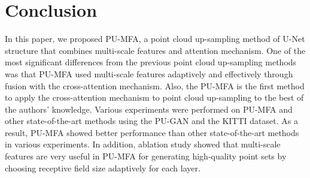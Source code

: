 \documentclass{article}
\begin{document}
\begin{table}[htb!]
\centering
{}
\caption{Quantitative evaluation results of the noise effects using the PU-GAN dataset.}
\label{tab:noise_test}
\end{table}

\section{Conclusion}
\label{sec:conclusion}
\quad In this paper, we proposed PU-MFA, a point cloud up-sampling method of U-Net structure that combines multi-scale features and attention mechanism. One of the most significant differences from the previous point cloud up-sampling methods was that PU-MFA used multi-scale features adaptively and effectively through fusion with the cross-attention mechanism. Also, the PU-MFA is the first method to apply the cross-attention mechanism to point cloud up-sampling to the best of the authors’ knowledge. Various experiments were performed on PU-MFA and other state-of-the-art methods using the PU-GAN and the KITTI dataset. As a result, PU-MFA showed better performance than other state-of-the-art methods in various experiments. In addition, ablation study showed that multi-scale features are very useful in PU-MFA for generating high-quality point sets by choosing receptive field size adaptively for each layer.
\end{document}
